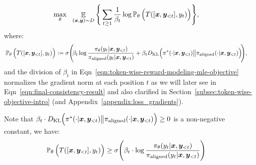 \begin{align}
    & \max_{\theta} \ \  \mathop{\mathbb E}_{(\bm{x}, \bm{y}) \sim D} \Bigg\{ \sum_{t \ge 1} \frac{1}{\beta_t}\log \mathop{\mathbb P_{\theta}}\Big(T([\bm{x}, \bm{y}_{<t}], y_t)\Big) \Bigg\} \label{eqn:token-wise-reward-modeling-mle-objective},
\end{align}
where: 
\begin{align}
    & \mathop{\mathbb P_{\theta}}\Big(T([\bx, \by_{<t}], y_t)\Big)  := \sigma \Bigg( \hspace{-.03in}\beta_t  \log \frac{\pi_{\theta}(y_t|\bx, \by_{< t})}{\pialigned(y_t|\bx, \by_{<t})} + \beta_t  \KL\Big(\pi^*(\cdot | \bx, \by_{<t}) \big\| \pialigned(\cdot | \bx, \by_{<t}) \Big) \hspace{-.03in}\Bigg),
    \label{eqn:inverse-rl-theta-objective}
\end{align}
and the division of $\beta_t$ in Eqn~\ref{eqn:token-wise-reward-modeling-mle-objective} normalizes the gradient norm at each position $t$ as we will later see in Eqn~\ref{eqn:final-consistency-result} and also clarified in Section~\ref{subsec:token-wise-objective-intro} (and Appendix~\ref{appendix:loss_gradients}).




Note that $\beta_t \cdot D_{\text{KL}}\Big(\pi^*(\cdot | \bm{x}, \bm{y}_{<t}) \big\| \pi_{\mathrm{aligned}}(\cdot | \bm{x}, \bm{y}_{<t}) \Big)\ge 0$ is a non-negative constant, we have: %
\begin{align}
    & \mathop{\mathbb P_{\theta}}\Big(T([\bm{x}, \bm{y}_{<t}], y_t)\Big) \ge \sigma \Bigg( \beta_t \cdot \log \frac{\pi_{\theta}(y_t|\bm{x}, \bm{y}_{< t})}{\pi_{\mathrm{aligned}}(y_t|\bm{x}, \bm{y}_{<t})} \Bigg)
\end{align}



